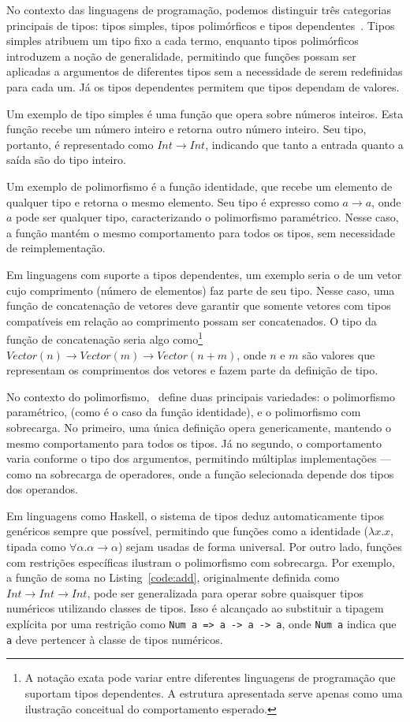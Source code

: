 No contexto das linguagens de programação, podemos distinguir três categorias principais de tipos: tipos simples, tipos polimórficos e tipos dependentes~\cite{pierce2002types}.
Tipos simples atribuem um tipo fixo a cada termo, enquanto tipos polimórficos introduzem a noção de generalidade, permitindo que funções possam ser aplicadas a argumentos de diferentes tipos sem a necessidade de serem redefinidas para cada um.
Já os tipos dependentes permitem que tipos dependam de valores.

Um exemplo de tipo simples é uma função que opera sobre números inteiros.
Esta função recebe um número inteiro e retorna outro número inteiro.
Seu tipo, portanto, é representado como $Int \rightarrow Int$, indicando que tanto a entrada quanto a saída são do tipo inteiro.

Um exemplo de polimorfismo é a função identidade, que recebe um elemento de qualquer tipo e retorna o mesmo elemento.
Seu tipo é expresso como $a \rightarrow a$, onde $a$ pode ser qualquer tipo, caracterizando o polimorfismo paramétrico.
Nesse caso, a função mantém o mesmo comportamento para todos os tipos, sem necessidade de reimplementação.

Em linguagens com suporte a tipos dependentes, um exemplo seria o de um vetor cujo comprimento (número de elementos) faz parte de seu tipo.
Nesse caso, uma função de concatenação de vetores deve garantir que somente vetores com tipos compatíveis em relação ao comprimento possam ser concatenados.
O tipo da função de concatenação seria algo como\footnote{A notação exata pode variar entre diferentes linguagens de programação que suportam tipos dependentes. A estrutura apresentada serve apenas como uma ilustração conceitual do comportamento esperado.} $Vector(n) \rightarrow Vector(m) \rightarrow Vector(n+m)$, onde $n$ e $m$ são valores que representam os comprimentos dos vetores e fazem parte da definição de tipo.

No contexto do polimorfismo,~ define duas principais variedades: o polimorfismo paramétrico, (como é o caso da função identidade), e o polimorfismo com sobrecarga.
No primeiro, uma única definição opera genericamente, mantendo o mesmo comportamento para todos os tipos. 
Já no segundo, o comportamento varia conforme o tipo dos argumentos, permitindo múltiplas implementações — como na sobrecarga de operadores, onde a função selecionada depende dos tipos dos operandos.

Em linguagens como Haskell, o sistema de tipos deduz automaticamente tipos genéricos sempre que possível, permitindo que funções como a identidade ($\lambda x.x$, tipada como $\forall \alpha. \alpha \to \alpha$) sejam usadas de forma universal. 
Por outro lado, funções com restrições específicas ilustram o polimorfismo com sobrecarga. 
Por exemplo, a função de soma no Listing~\ref{code:add}, originalmente definida como $Int \rightarrow Int \rightarrow Int$, pode ser generalizada para operar sobre quaisquer tipos numéricos utilizando classes de tipos. 
Isso é alcançado ao substituir a tipagem explícita por uma restrição como \texttt{Num a => a -> a -> a}, onde \texttt{Num a} indica que \texttt{a} deve pertencer à classe de tipos numéricos.

